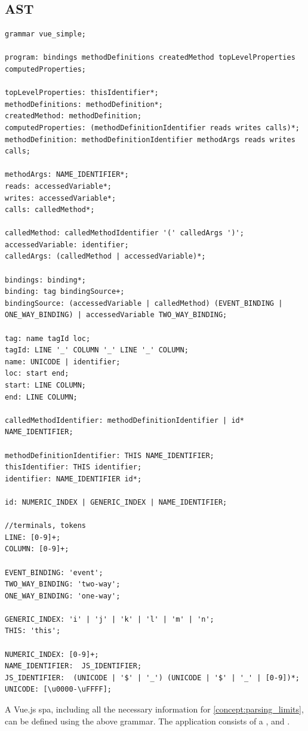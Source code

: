 \subsection{AST}
\label{ast}
\begin{lstlisting}[language=antrl,basicstyle=\fontsize{8}{8}\selectfont\ttfamily,caption={Simplfied Vue.js AST}, captionpos=b]
grammar vue_simple;

program: bindings methodDefinitions createdMethod topLevelProperties computedProperties;

topLevelProperties: thisIdentifier*;
methodDefinitions: methodDefinition*; 
createdMethod: methodDefinition;
computedProperties: (methodDefinitionIdentifier reads writes calls)*;
methodDefinition: methodDefinitionIdentifier methodArgs reads writes calls;

methodArgs: NAME_IDENTIFIER*;
reads: accessedVariable*;
writes: accessedVariable*;
calls: calledMethod*;

calledMethod: calledMethodIdentifier '(' calledArgs ')';
accessedVariable: identifier;
calledArgs: (calledMethod | accessedVariable)*;

bindings: binding*;
binding: tag bindingSource+;
bindingSource: (accessedVariable | calledMethod) (EVENT_BINDING | ONE_WAY_BINDING) | accessedVariable TWO_WAY_BINDING;

tag: name tagId loc;
tagId: LINE '_' COLUMN '_' LINE '_' COLUMN;
name: UNICODE | identifier;
loc: start end;
start: LINE COLUMN;
end: LINE COLUMN;

calledMethodIdentifier: methodDefinitionIdentifier | id* NAME_IDENTIFIER;

methodDefinitionIdentifier: THIS NAME_IDENTIFIER;
thisIdentifier: THIS identifier;
identifier: NAME_IDENTIFIER id*;

id: NUMERIC_INDEX | GENERIC_INDEX | NAME_IDENTIFIER;

//terminals, tokens
LINE: [0-9]+;
COLUMN: [0-9]+;

EVENT_BINDING: 'event';
TWO_WAY_BINDING: 'two-way';
ONE_WAY_BINDING: 'one-way';

GENERIC_INDEX: 'i' | 'j' | 'k' | 'l' | 'm' | 'n';
THIS: 'this';

NUMERIC_INDEX: [0-9]+;
NAME_IDENTIFIER:  JS_IDENTIFIER;
JS_IDENTIFIER:  (UNICODE | '$' | '_') (UNICODE | '$' | '_' | [0-9])*;
UNICODE: [\u0000-\uFFFF];
\end{lstlisting}


A Vue.js \gls{spa}, including all the necessary information for \ref{concept:parsing_limits}, can be defined using the above grammar. The application consists of   a ,  and . 

